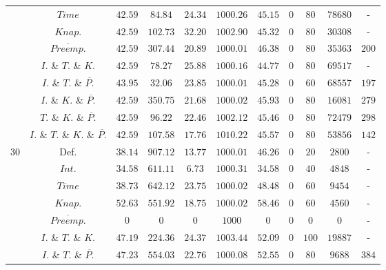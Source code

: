 \documentclass{article}
\begin{document}
\begin{table}[!htb]
{\begin{tabular}{|c|c|c|cc|cccccc|}
                             & $Time$  & $42.59$ & $84.84$ & $24.34$ & $1000.26$ & $45.15$ & $0$ & $80$ & $78680$ & - \\ 
                             & $Knap.$  & $42.59$ & $102.73$ & $32.20$ & $1002.90$ & $45.32$ & $0$ & $80$ & $30308$ & - \\ 
                             & $\overline{Preemp.}$&$42.59$ & $307.44$ & $20.89$ & $1000.01$ & $46.38$ & $0$ & $80$ & $35363$ & $200 $ \\ 
                             & $I.$ \& $T.$ \& $K.$ &$42.59$ & $78.27$ & $25.88$ & $1000.16$ & $44.77$ & $0$ & $80$ & $69517$ & - \\ 
                             & $I.$ \& $T.$ \& $\overline{P.}$  & $43.95$ & $32.06$ & $23.85$ & $1000.01$ & $45.28$ & $0$ & $60$ & $68557$ & $197 $ \\ 
                             & $I.$ \& $K.$ \& $\overline{P.}$  &$42.59$ & $350.75$ & $21.68$ & $1000.02$ & $45.93$ & $0$ & $80$ & $16081$ & $279 $ \\ 
                             & $T.$ \& $K.$ \& $\overline{P.}$  & $42.59$ & $96.22$ & $22.46$ & $1002.12$ & $45.46$ & $0$ & $80$ & $72479$ & $298 $ \\ 
                             & $I.$ \& $T.$ \& $K.$ \& $\overline{P.}$  & $42.59$ & $107.58$ & $17.76$ & $1010.22$ & $45.57$ & $0$ & $80$ & $53856$ & $142 $ \\ 
    \hline
    \multirow{10}{*}{30} &  Def. & $38.14$ & $907.12$ & $13.77$ & $1000.01$ & $46.26$ & $0$ & $20$ & $2800$ & - \\ 
                             & $Int.$ & $34.58$ & $611.11$ & $6.73$ & $1000.31$ & $34.58$ & $0$ & $40$ & $4848$ & - \\ 
                             & $Time$  & $38.73$ & $642.12$ & $23.75$ & $1000.02$ & $48.48$ & $0$ & $60$ & $9454$ & - \\ 
                             & $Knap.$  & $52.63$ & $551.92$ & $18.75$ & $1000.02$ & $58.46$ & $0$ & $60$ & $4560$ & - \\ 
                             & $\overline{Preemp.}$&$0$ & $0$ & $0$ & $1000$ & $0$ & $0$ & $0$ & $0$ & - \\ 
                             & $I.$ \& $T.$ \& $K.$ &$47.19$ & $224.36$ & $24.37$ & $1003.44$ & $52.09$ & $0$ & $100$ & $19887$ & - \\ 
                             & $I.$ \& $T.$ \& $\overline{P.}$  &$47.23$ & $554.03$ & $22.76$ & $1000.08$ & $52.55$ & $0$ & $80$ & $9688$ & $384 $ \\ 

\end{tabular}}
\end{table}
\end{document}
